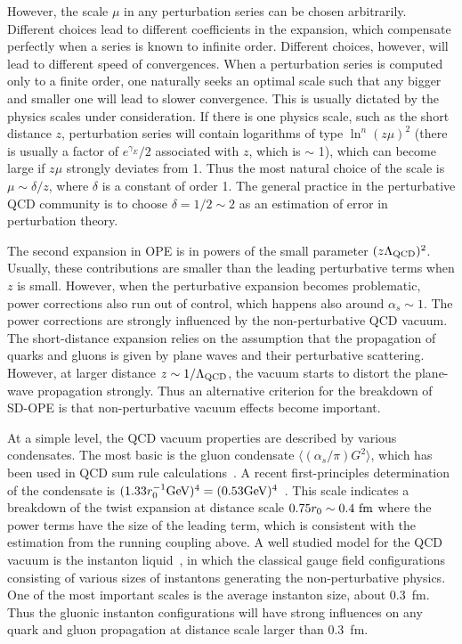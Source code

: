 \documentclass[prd,aps,twocolumn,preprintnumbers,showpacs,nofootinbib,superscriptaddress,notitlepage]{revtex4-2}
\begin{document}
However, the scale $\mu$ in any perturbation series can be chosen arbitrarily. Different choices lead to different coefficients in the expansion, which compensate perfectly when a series is known to infinite order. Different choices, however, will lead to different speed of convergences. When a perturbation series is computed only to a finite order, one naturally seeks an optimal scale such that any bigger and smaller one will lead to slower convergence. This is usually dictated by the physics scales under consideration. If there is one physics scale, such as the short distance $z$, perturbation series will contain logarithms of
type $\ln^n(z\mu)^2$ (there is usually a factor of $e^{\gamma_E}/2$ associated with $z$, which is $\sim$ 1), which can become large if $z\mu$ strongly deviates from 1. Thus the most natural choice of the scale is $\mu\sim \delta/z$, where $\delta$ is a constant of order 1. The general practice in the perturbative QCD community is to choose $\delta =1/2\sim 2$ as an estimation of error in perturbation theory. 

The second expansion in OPE is in powers of the small parameter $(z\Lambda_{\rm QCD})^2$. Usually, these contributions are smaller than the leading perturbative terms when $z$ is small. However, 
when the perturbative expansion becomes problematic, power corrections also 
run out of control, 
which happens also around $\alpha_s\sim 1$. The power corrections are strongly  influenced by the non-perturbative QCD vacuum. The short-distance expansion relies on the assumption that the propagation of quarks and gluons is
given by plane waves and their perturbative scattering. However, at larger distance $z\sim 1/\Lambda_{\rm QCD}$, the vacuum starts to distort the plane-wave propagation strongly. 
Thus an alternative criterion for the breakdown of SD-OPE is that  non-perturbative vacuum effects become important. 

At a simple level, the QCD vacuum properties are
described by various condensates. The most basic 
is the gluon condensate $\langle (\alpha_s/\pi)G^2\rangle$, which has been used in QCD sum rule calculations~\cite{Shifman:1978bx}.
A recent first-principles determination of the condensate is $(1.33r_0^{-1}\rm GeV)^4 = (0.53 \rm GeV)^4$~\cite{Ayala:2020pxq}. This scale indicates a breakdown of the twist expansion at distance scale $0.75r_0\sim 0.4~{\rm fm}$ where the power terms have the size of the leading term, which is consistent with the estimation from the running coupling above. A well studied model for the QCD vacuum is the instanton liquid~\cite{Schafer:1996wv}, in which  the classical gauge field configurations consisting of various sizes of instantons generating the non-perturbative physics. One of the most important scales is the average instanton size, 
about 0.3~fm. Thus the gluonic instanton configurations will have strong influences on any quark and gluon propagation at distance scale larger than 0.3~fm. 
\end{document}
